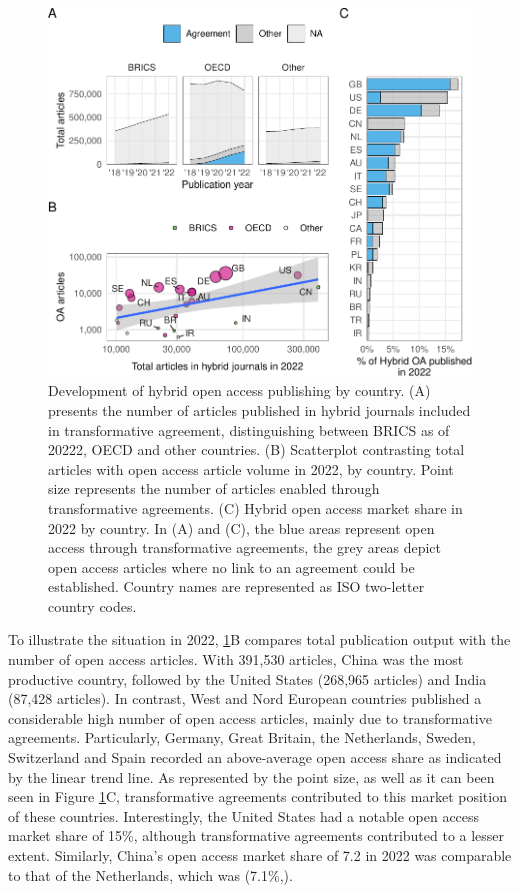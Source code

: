 \documentclass[a4paper,man,floatsintext,longtable,noextraspace,12pt]{apa6}
\begin{document}
\begin{figure}[ht!]

{\centering \includegraphics[width=0.99\linewidth,]{fig/country_patch-1} 

}

\caption{Development of hybrid open access publishing by country. (A) presents the number of articles published in hybrid journals included in transformative agreement, distinguishing between BRICS as of 20222, OECD and other countries. (B) Scatterplot contrasting total articles with open access article volume in 2022, by country. Point size represents the number of articles enabled through transformative agreements. (C) Hybrid open access market share in 2022 by country. In (A) and (C), the blue areas represent open access through transformative agreements, the grey areas depict open access articles where no link to an agreement could be established. Country names are represented as ISO two-letter country codes.}\label{fig:country_patch}
\end{figure}

To illustrate the situation in 2022, \ref{fig:country_patch}B compares
total publication output with the number of open access articles. With
391,530 articles, China was the most productive country, followed by the
United States (268,965 articles) and India (87,428 articles). In
contrast, West and Nord European countries published a considerable high
number of open access articles, mainly due to transformative agreements.
Particularly, Germany, Great Britain, the Netherlands, Sweden,
Switzerland and Spain recorded an above-average open access share as
indicated by the linear trend line. As represented by the point size, as
well as it can been seen in Figure \ref{fig:country_patch}C,
transformative agreements contributed to this market position of these
countries. Interestingly, the United States had a notable open access
market share of 15\%, although transformative agreements contributed to
a lesser extent. Similarly, China's open access market share of 7.2 in
2022 was comparable to that of the Netherlands, which was (7.1\%,).
\end{document}
